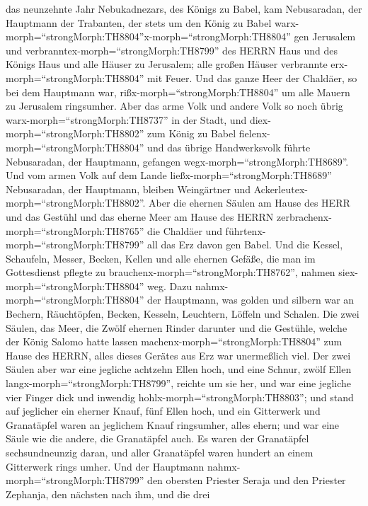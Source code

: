 das neunzehnte Jahr Nebukadnezars, des Königs zu Babel, kam Nebusaradan,
der Hauptmann der Trabanten, der stets um den König zu Babel
warx-morph=``strongMorph:TH8804''x-morph=``strongMorph:TH8804'' gen
Jerusalem  und verbranntex-morph=``strongMorph:TH8799'' des
HERRN Haus und des Königs Haus und alle Häuser zu Jerusalem; alle großen
Häuser verbrannte erx-morph=``strongMorph:TH8804'' mit Feuer.
 Und das ganze Heer der Chaldäer, so bei dem Hauptmann war,
rißx-morph=``strongMorph:TH8804'' um alle Mauern zu Jerusalem
ringsumher.  Aber das arme Volk und andere Volk so noch
übrig warx-morph=``strongMorph:TH8737'' in der Stadt, und
diex-morph=``strongMorph:TH8802'' zum König zu Babel
fielenx-morph=``strongMorph:TH8804'' und das übrige Handwerksvolk führte
Nebusaradan, der Hauptmann, gefangen wegx-morph=``strongMorph:TH8689''.
 Und vom armen Volk auf dem Lande
ließx-morph=``strongMorph:TH8689'' Nebusaradan, der Hauptmann, bleiben
Weingärtner und Ackerleutex-morph=``strongMorph:TH8802''. 
Aber die ehernen Säulen am Hause des HERR und das Gestühl und das eherne
Meer am Hause des HERRN zerbrachenx-morph=``strongMorph:TH8765'' die
Chaldäer und führtenx-morph=``strongMorph:TH8799'' all das Erz davon gen
Babel.  Und die Kessel, Schaufeln, Messer, Becken, Kellen
und alle ehernen Gefäße, die man im Gottesdienst pflegte zu
brauchenx-morph=``strongMorph:TH8762'', nahmen
siex-morph=``strongMorph:TH8804'' weg.  Dazu
nahmx-morph=``strongMorph:TH8804'' der Hauptmann, was golden und silbern
war an Bechern, Räuchtöpfen, Becken, Kesseln, Leuchtern, Löffeln und
Schalen.  Die zwei Säulen, das Meer, die Zwölf ehernen
Rinder darunter und die Gestühle, welche der König Salomo hatte lassen
machenx-morph=``strongMorph:TH8804'' zum Hause des HERRN, alles dieses
Gerätes aus Erz war unermeßlich viel.  Der zwei Säulen aber
war eine jegliche achtzehn Ellen hoch, und eine Schnur, zwölf Ellen
langx-morph=``strongMorph:TH8799'', reichte um sie her, und war eine
jegliche vier Finger dick und inwendig
hohlx-morph=``strongMorph:TH8803'';  und stand auf
jeglicher ein eherner Knauf, fünf Ellen hoch, und ein Gitterwerk und
Granatäpfel waren an jeglichem Knauf ringsumher, alles ehern; und war
eine Säule wie die andere, die Granatäpfel auch.  Es waren
der Granatäpfel sechsundneunzig daran, und aller Granatäpfel waren
hundert an einem Gitterwerk rings umher.  Und der Hauptmann
nahmx-morph=``strongMorph:TH8799'' den obersten Priester Seraja und den
Priester Zephanja, den nächsten nach ihm, und die drei
